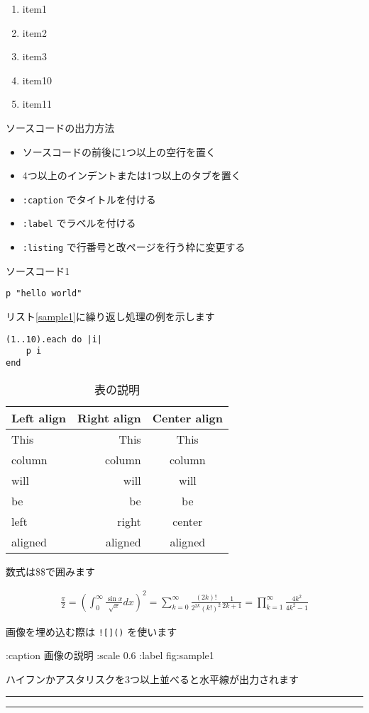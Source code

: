 \documentclass[a4j]{jarticle}
\begin{document}
\begin{enumerate}
\item item1
\item item2
\item item3
\item item10
\item item11
\end{enumerate}

ソースコードの出力方法

\begin{itemize}
\item ソースコードの前後に1つ以上の空行を置く
\item 4つ以上のインデントまたは1つ以上のタブを置く
\item {\tt :caption} でタイトルを付ける
\item {\tt :label} でラベルを付ける
\item {\tt :listing} で行番号と改ページを行う枠に変更する
\end{itemize}

\begin{itembox}[c]{ソースコード1}\begin{verbatim}
p "hello world"
\end{verbatim}\end{itembox}

リスト\ref{sample1}に繰り返し処理の例を示します

\begin{lstlisting}[caption=繰り返しの例 ,label=sample1]
(1..10).each do |i|
	p i
end
\end{lstlisting}

\begin{table}[h]
\centering
\caption{表の説明 }
\label{table:1}
\begin{tabular}{|l|r|c|}
\hline
Left align & Right align & Center align\\
\hline
This & This & This\\
column & column & column\\
will & will & will\\
be & be & be\\
left & right & center\\
aligned & aligned & aligned\\
\hline
\end{tabular}
\end{table}

数式は\$\$で囲みます

\begin{eqnarray*}
\frac{\pi}{2}
= \left( \int_{0}^{\infty} \frac{\sin x}{\sqrt{x}} dx \right)^2 
= \sum_{k=0}^{\infty} \frac{(2k)!}{2^{2k}(k!)^2} \frac{1}{2k+1} 
= \prod_{k=1}^{\infty} \frac{4k^2}{4k^2 - 1}
\end{eqnarray*}

画像を埋め込む際は {\tt ![]()} を使います


 :caption 画像の説明 :scale 0.6 :label fig:sample1 \fi

ハイフンかアスタリスクを3つ以上並べると水平線が出力されます

\begin{center}
\rule{3in}{0.4pt}
\end{center}

\begin{center}
\rule{3in}{0.4pt}
\end{center}
\end{document}
